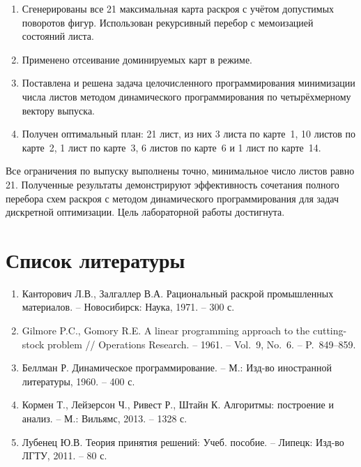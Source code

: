 \begin{enumerate}
    \item Сгенерированы все 21 максимальная карта раскроя с учётом
          допустимых поворотов фигур. Использован рекурсивный перебор с
          мемоизацией состояний листа.
    \item Применено отсеивание доминируемых карт в режиме.
    \item Поставлена и решена задача целочисленного программирования
          минимизации числа листов методом динамического программирования
          по четырёхмерному вектору выпуска.
    \item Получен оптимальный план: 21 лист, из них 3 листа по карте~1,
          10 листов по карте~2, 1 лист по карте~3, 6 листов по карте~6
          и 1 лист по карте~14.
\end{enumerate}

Все ограничения по выпуску выполнены точно, минимальное число листов
равно 21. Полученные результаты демонстрируют эффективность сочетания
полного перебора схем раскроя с методом динамического программирования
для задач дискретной оптимизации. Цель лабораторной работы достигнута.

\clearpage

\section{Список литературы}

\begin{enumerate}
    \item Канторович Л.В., Залгаллер В.А. Рациональный раскрой
          промышленных материалов. -- Новосибирск: Наука, 1971. -- 300 с.
    \item Gilmore P.C., Gomory R.E. A linear programming approach to the
          cutting-stock problem // Operations Research. -- 1961. --
          Vol.~9, No.~6. -- P.~849--859.
    \item Беллман Р. Динамическое программирование. -- М.: Изд-во
          иностранной литературы, 1960. -- 400 с.
    \item Кормен Т., Лейзерсон Ч., Ривест Р., Штайн К. Алгоритмы:
          построение и анализ. -- М.: Вильямс, 2013. -- 1328 с.
    \item Лубенец Ю.В. Теория принятия решений: Учеб. пособие. --
          Липецк: Изд-во ЛГТУ, 2011. -- 80 с.
\end{enumerate}
